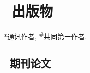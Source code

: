 \newcommand{\Revision}{\songtix{返修}}
\newcommand{\Review}{\songtix{审稿}}
\newcommand{\Submitted}{\songtix{投稿}}
\newcommand{\CS}{*} %
\newcommand{\CF}{\textsuperscript{\#}} %


\section{\texorpdfstring{\faBook\ 出版物}{出版物}}
\CS 通讯作者, \CF 共同第一作者.

\subsection*{\texorpdfstring{\faBook\ 期刊论文}{期刊论文}}
